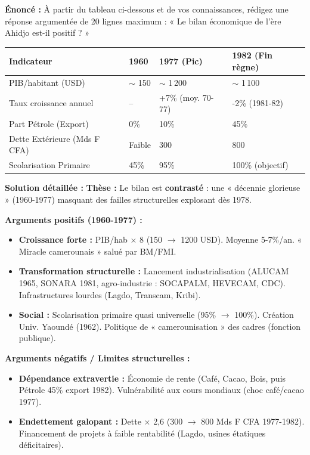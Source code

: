\documentclass[11pt]{article}
\begin{document}
\begin{exoresolu}
\textbf{Énoncé :} À partir du tableau ci-dessous et de vos connaissances, rédigez une réponse argumentée de 20 lignes maximum : « Le bilan économique de l'ère Ahidjo est-il positif ? »
\begin{center}
\begin{tabularx}{\linewidth}{|l|X|X|X|}\hline
\textbf{Indicateur} & \textbf{1960} & \textbf{1977 (Pic)} & \textbf{1982 (Fin règne)} \\ \hline
PIB/habitant (USD) & $\sim$ 150 & $\sim$ 1\,200 & $\sim$ 1\,100 \\ \hline
Taux croissance annuel & -- & +7\% (moy. 70-77) & -2\% (1981-82) \\ \hline
Part Pétrole (Export) & 0\% & 10\% & 45\% \\ \hline
Dette Extérieure (Mds F CFA) & Faible & 300 & 800 \\ \hline
Scolarisation Primaire & 45\% & 95\% & 100\% (objectif) \\ \hline
\end{tabularx}
\end{center}
\tcblower
\textbf{Solution détaillée :}
\textbf{Thèse :} Le bilan est \textbf{contrasté} : une « décennie glorieuse » (1960-1977) masquant des failles structurelles explosant dès 1978.
\par
\textbf{Arguments positifs (1960-1977) :}
\begin{itemize}
    \item \textbf{Croissance forte :} PIB/hab $\times$ 8 (150 $\rightarrow$ 1200 USD). Moyenne 5-7\%/an. « Miracle camerounais » salué par BM/FMI.
    \item \textbf{Transformation structurelle :} Lancement industrialisation (ALUCAM 1965, SONARA 1981, agro-industrie : SOCAPALM, HEVECAM, CDC). Infrastructures lourdes (Lagdo, Transcam, Kribi).
    \item \textbf{Social :} Scolarisation primaire quasi universelle (95\% $\rightarrow$ 100\%). Création Univ. Yaoundé (1962). Politique de « camerounisation » des cadres (fonction publique).
\end{itemize}
\textbf{Arguments négatifs / Limites structurelles :}
\begin{itemize}
    \item \textbf{Dépendance extravertie :} Économie de rente (Café, Cacao, Bois, puis Pétrole 45\% export 1982). Vulnérabilité aux cours mondiaux (choc café/cacao 1977).
    \item \textbf{Endettement galopant :} Dette $\times$ 2,6 (300 $\rightarrow$ 800 Mds F CFA 1977-1982). Financement de projets à faible rentabilité (Lagdo, usines étatiques déficitaires).

\end{itemize}
\end{exoresolu}
\end{document}
